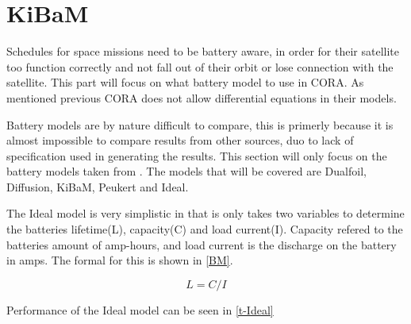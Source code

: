 \section{KiBaM}\label{sec:kibam}
Schedules for space missions need to be battery aware, in order for their satellite too function correctly and not fall out of their orbit or lose connection with the satellite. This part will focus on what battery model to use in CORA. As mentioned previous CORA does not allow differential equations in their models.

Battery models are by nature difficult to compare, this is primerly because it is almost impossible to compare results from other sources, duo to lack of specification used in generating the results. This section will only focus on the battery models taken from \cite{battery_model}. The models that will be covered are Dualfoil, Diffusion, KiBaM, Peukert and Ideal.

The Ideal model is very simplistic in that is only takes two variables to determine the batteries lifetime(L), capacity(C) and load current(I). Capacity refered to the batteries amount of amp-hours, and load current is the discharge on the battery in amps. The formal for this is shown in \cref{BM}.

\begin{equation}\label{BM}
L=C/I
\end{equation}

Performance of the Ideal model can be seen in \cref{t-Ideal}

